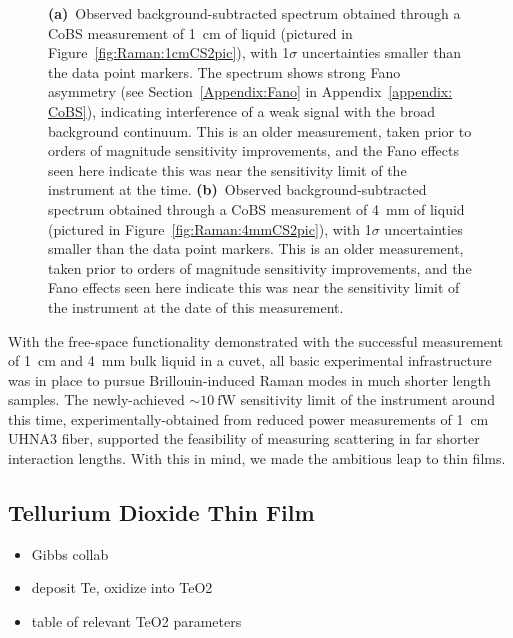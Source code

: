\begin{figure}[t]
\begin{subfigure}[b]{0.49\textwidth}
    \label{fig:Raman:4mmCS2}
  \end{subfigure}
  \caption[\ac{CoBS} measurements of \SI{1}{\centi\meter} and \SI{4}{\milli\meter} liquid .]{\textbf{(a)}~Observed background-subtracted spectrum obtained through a \ac{CoBS} measurement of \SI{1}{\centi\meter} of liquid  (pictured in Figure~\ref{fig:Raman:1cmCS2pic}), with 1\(\sigma\) uncertainties smaller than the data point markers. The spectrum shows strong Fano asymmetry (see Section~\ref{Appendix:Fano} in Appendix~\ref{appendix: CoBS}), indicating interference of a weak signal with the broad background continuum. This is an older measurement, taken prior to orders of magnitude sensitivity improvements, and the Fano effects seen here indicate this was near the sensitivity limit of the instrument at the time. \textbf{(b)}~Observed background-subtracted spectrum obtained through a \ac{CoBS} measurement of \SI{4}{\milli\meter} of liquid  (pictured in Figure~\ref{fig:Raman:4mmCS2pic}), with 1\(\sigma\) uncertainties smaller than the data point markers. This is an older measurement, taken prior to orders of magnitude sensitivity improvements, and the Fano effects seen here indicate this was near the sensitivity limit of the instrument at the date of this measurement.}
  \label{fig:Raman:CS2Cuvet}
\end{figure}

With the free-space functionality demonstrated with the successful measurement of \SI{1}{\centi\meter} and \SI{4}{\milli\meter} bulk liquid  in a cuvet, all basic experimental infrastructure was in place to pursue Brillouin-induced Raman modes in much shorter length samples. The newly-achieved \(\sim\SI{10}{\femto\watt}\) sensitivity limit of the instrument around this time, experimentally-obtained from reduced power measurements of \SI{1}{\centi\meter} \ac{UHNA3} fiber, supported the feasibility of measuring scattering in far shorter interaction lengths. With this in mind, we made the ambitious leap to thin films.

\subsection{Tellurium Dioxide Thin Film}
\label{subsec:Raman:Target:TeO2}

\begin{itemize}
  \item Gibbs collab
  \item deposit Te, oxidize into TeO2
  \item table of relevant TeO2 parameters
\end{itemize}

